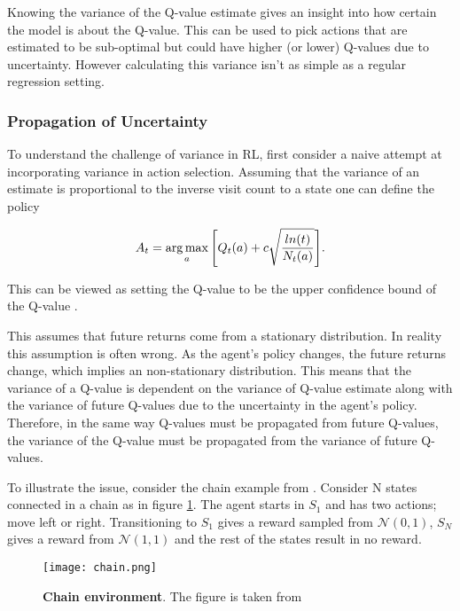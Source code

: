 Knowing the variance of the Q-value estimate gives an insight into how certain the model is about the Q-value. This can be used to pick actions that are estimated to be sub-optimal but could have higher (or lower) Q-values due to uncertainty. However calculating this variance isn't as simple as a regular regression setting.

\subsubsection{Propagation of Uncertainty}

To understand the challenge of variance in RL, first consider a naive attempt at incorporating variance in action selection. Assuming that the variance of an estimate is proportional to the inverse visit count to a state one can define the policy

\begin{equation}
    A_t = \operatorname*{arg\,max}_a \Bigg[Q_t(a) + c\sqrt\frac{ln(t)}{N_t(a)}\Bigg].
    \label{eq:ucb}
\end{equation}

This can be viewed as setting the Q-value to be the upper confidence bound of the Q-value \citep{strehl_2008}\citep[p.~35-36]{sutton_barto_2018}.

This assumes that future returns come from a stationary distribution. In reality this assumption is often wrong. As the agent's policy changes, the future returns change, which implies an non-stationary distribution. This means that the variance of a Q-value is dependent on the variance of Q-value estimate along with the variance of future Q-values due to the uncertainty in the agent's policy. Therefore, in the same way Q-values must be propagated from future Q-values, the variance of the Q-value must be propagated from the variance of future Q-values. \citep{moerland_2017}

To illustrate the issue, consider the chain example from \cite{osband_2016}. Consider N states connected in a chain as in figure \ref{fig:chain}. The agent starts in $S_1$ and has two actions; move left or right. Transitioning to $S_1$ gives a reward sampled from $\mathcal{N}(0,1)$, $S_N$ gives a reward from $\mathcal{N}(1,1)$ and the rest of the states result in no reward.


\begin{figure}[H]
    \centering
    \texttt{[image: chain.png]}
    \caption{\textbf{Chain environment}. The figure is taken from \cite{osband_2016}}
    \label{fig:chain}
\end{figure}

